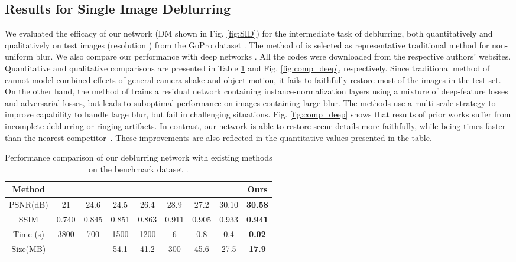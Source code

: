 \documentclass[10pt,twocolumn,letterpaper]{article}
\begin{document}
\subsection{Results for Single Image Deblurring }
We evaluated the efficacy of our network (DM shown in Fig. \ref{fig:SID}) for the intermediate task of deblurring, both quantitatively and qualitatively on  test images (resolution ) from the GoPro dataset \cite{nah2017deep}. The method of \cite{whyte2012non} is selected as representative traditional method for non-uniform blur. We also compare our performance with deep networks \cite{nah2017deep,kupyn2017deblurgan,tao2018scale}. All the codes were downloaded from the respective authors' websites. Quantitative and qualitative comparisons are presented in Table \ref{TableGopro} and Fig. \ref{fig:comp_deep}, respectively. Since traditional method of \cite{whyte2012non} cannot model combined effects of general camera shake and object motion, it fails to faithfully restore most of the images in the test-set. On the other hand, the method of \cite{kupyn2017deblurgan} trains a residual network containing instance-normalization layers using a mixture of deep-feature losses and adversarial losses, but leads to suboptimal performance on images containing large blur. The methods \cite{nah2017deep,tao2018scale} use a multi-scale strategy to improve capability to handle large blur, but fail in challenging situations. Fig. \ref{fig:comp_deep} shows that results of prior works suffer from incomplete deblurring or ringing artifacts. In contrast, our network is able to restore scene details more faithfully, while being  times faster than the nearest competitor~\cite{tao2018scale}. These improvements are also reflected in the quantitative values presented in the table.


\setlength{\tabcolsep}{1.4pt}
\begin{table}[]
\centering
\begin{tabular}{|c|c|c|c|c|c|c|c|c|}
\hline

Method & \cite{xu2013unnatural} & \cite{whyte2012non} & \cite{sun2015learning} & \cite{gong2017motion} & \cite{nah2017deep} & \cite{kupyn2017deblurgan} & \cite{tao2018scale} & Ours \\
\hline
\small{PSNR(dB)} & 21 & 24.6 & 24.5 &  26.4  & 28.9 & 27.2 & 30.10 & \textbf{30.58} \\
\small{SSIM} & 0.740 & 0.845 & 0.851 & 0.863 & 0.911 & 0.905 & 0.933 & \textbf{0.941}\\
\small{Time (s)} & 3800 & 700 & 1500 & 1200 & 6 & 0.8 & 0.4 & \textbf{0.02} \\
\small{Size(MB)} & - & - & 54.1 & 41.2 & 300 & 45.6 & 27.5 & \textbf{17.9} \\
\hline
\end{tabular}
\vspace{0mm}
\caption{Performance comparison of our deblurring network with existing methods on the benchmark dataset \cite{nah2017deep}.
\vspace{-4mm}
\label{TableGopro}}
\end{table}
\setlength{\tabcolsep}{1.4pt}
\end{document}
